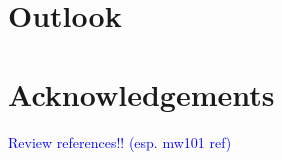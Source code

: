 \documentclass[
 aps,
 a4paper,
 showpacs,
 superscriptaddress,
 notitlepage,
 nofootinbib,
 preprint %
]{revtex4-1}
\newcommand{\cm}[1]{\textcolor{blue}{#1}} %
\begin{document}
\section{Outlook}
\label{outlook}


\clearpage

\section*{Acknowledgements}


\cm{Review references!! (esp. mw101 ref)}


\end{document}
